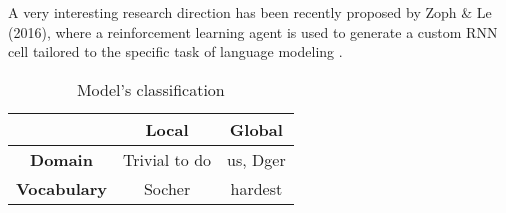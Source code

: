 A very interesting research direction has been recently proposed by Zoph \& Le (2016), where a reinforcement learning agent is used to generate a custom
RNN cell tailored to the specific task of language modeling \cite{zoph2016neural}.

\begin{table}[H]
	\centering
	\begin{tabular}{c|c|c|}
		\cline{2-3}
		& \textbf{Local} & \textbf{Global} \\ \hline
		\multicolumn{1}{|c|}{\textbf{Domain}}     & Trivial to do  & us, Dger        \\ \hline
		\multicolumn{1}{|c|}{\textbf{Vocabulary}} & Socher         & hardest         \\ \hline
	\end{tabular}
	\caption{Model's classification}
	\label{classification}
\end{table}
